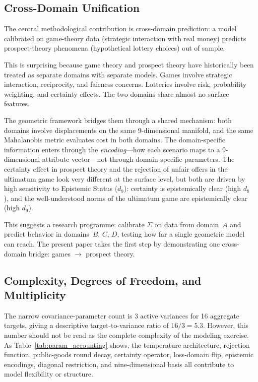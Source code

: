 \documentclass[journal]{IEEEtran}
\begin{document}
\subsection{Cross-Domain Unification}

The central methodological contribution is cross-domain prediction: a model calibrated on game-theory data (strategic interaction with real money) predicts prospect-theory phenomena (hypothetical lottery choices) out of sample.

This is surprising because game theory and prospect theory have historically been treated as separate domains with separate models.
Games involve strategic interaction, reciprocity, and fairness concerns.
Lotteries involve risk, probability weighting, and certainty effects.
The two domains share almost no surface features.

The geometric framework bridges them through a shared mechanism: both domains involve displacements on the same 9-dimensional manifold, and the same Mahalanobis metric evaluates cost in both domains.
The domain-specific information enters through the \emph{encoding}---how each scenario maps to a 9-dimensional attribute vector---not through domain-specific parameters.
The certainty effect in prospect theory and the rejection of unfair offers in the ultimatum game look very different at the surface level, but both are driven by high sensitivity to Epistemic Status ($d_9$): certainty is epistemically clear (high $d_9$), and the well-understood norms of the ultimatum game are epistemically clear (high $d_9$).

This suggests a research programme: calibrate $\Sigma$ on data from domain~$A$ and predict behavior in domains~$B$, $C$, $D$, testing how far a single geometric model can reach.
The present paper takes the first step by demonstrating one cross-domain bridge: games $\to$ prospect theory.

\subsection{Complexity, Degrees of Freedom, and Multiplicity}

The narrow covariance-parameter count is 3 active variances for 16 aggregate targets, giving a descriptive target-to-variance ratio of $16/3=5.3$.
However, this number should not be read as the complete complexity of the modeling exercise.
As Table~\ref{tab:param_accounting} shows, the temperature architecture, rejection function, public-goods round decay, certainty operator, loss-domain flip, epistemic encodings, diagonal restriction, and nine-dimensional basis all contribute to model flexibility or structure.
\end{document}
